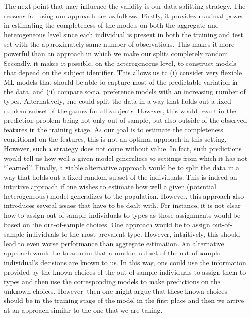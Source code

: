 \documentclass[11pt,a4paper]{article}
\theoremstyle{definition}
\begin{document}
The next point that may influence the validity is our data-splitting strategy. The reasons for using our approach are as follows. Firstly, it provides maximal power in estimating the completeness of the models on both the aggregate and heterogeneous level since each individual is present in both the training and test set with the approximately same number of observations. This makes it more powerful than an approach in which we make our splits completely random. Secondly,  it makes it possible, on the heterogeneous level, to construct models that depend on the subject identifier. This allows us to (i) consider very flexible ML models that should be able to capture most of the predictable variation in the data, and (ii) compare social preference models with an increasing number of types.
Alternatively, one could split the data in a way that holds out a fixed random subset of the games for all subjects. However, this would result in the prediction problem being not only out-of-sample, but also outside of the observed features in the training stage. As our goal is to estimate the completeness conditional on the features, this is not an optimal approach in this setting. However, such a strategy does not come without value. In fact, such predictions would tell us how well a given model generalizes to settings from which it has not ``learned''.
Finally, a viable alternative approach would be to split the data in a way that holds out a fixed random subset of the individuals. This is indeed an intuitive approach if one wishes to estimate how well a given (potential heterogeneous) model generalizes to the population. However, this approach also introduces several issues that have to be dealt with. For instance, it is not clear how to assign out-of-sample individuals to types as those assignments would be based on the out-of-sample choices. One approach would be to assign out-of-sample individuals to the most prevalent type. However, intuitively, this should lead to even worse performance than aggregate estimation. An alternative approach would be to assume that a random subset of the out-of-sample individual's decisions are known to us. In this way, one could use the information provided by the known choices of the out-of-sample individuals to assign them to types and then use the corresponding models to make predictions on the unknown choices. However, then one might argue that these known choices should be in the training stage of the model in the first place and then we arrive at an approach similar to the one that we are taking.
\end{document}
